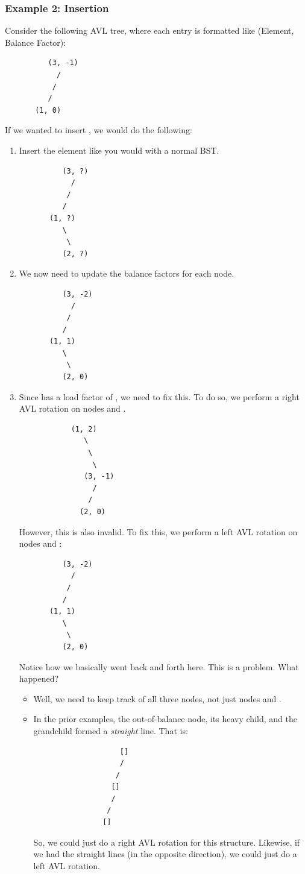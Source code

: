 \documentclass[letterpaper]{article}
\begin{document}
\subsubsection{Example 2: Insertion}
Consider the following AVL tree, where each entry is formatted like (Element, Balance Factor): 
\begin{verbatim}
          (3, -1)
            /
           /
          /
       (1, 0)
\end{verbatim}
If we wanted to insert , we would do the following: 
\begin{enumerate}[(1)]
    \item Insert the element like you would with a normal BST. 
    \begin{verbatim}
          (3, ?)
            /
           /
          /
       (1, ?)
          \ 
           \ 
          (2, ?)
    \end{verbatim}

    \item We now need to update the balance factors for each node. 
    \begin{verbatim}
          (3, -2)
            /
           /
          /
       (1, 1)
          \ 
           \ 
          (2, 0)
    \end{verbatim}

    \item Since  has a load factor of , we need to fix this. To do so, we perform a right AVL rotation on nodes  and .
    \begin{verbatim}
            (1, 2)
               \ 
                \ 
                 \ 
               (3, -1)
                 /
                /
              (2, 0)      
    \end{verbatim}
    However, this is also invalid. To fix this, we perform a left AVL rotation on nodes  and : 
    \begin{verbatim}
          (3, -2)
            /
           /
          /
       (1, 1)
          \ 
           \ 
          (2, 0)
    \end{verbatim}
    Notice how we basically went back and forth here. This is a problem. What happened? 
    \begin{itemize}
        \item Well, we need to keep track of all three nodes, not just nodes  and .
        \item In the prior examples, the out-of-balance node, its heavy child, and the grandchild formed a \emph{straight} line. That is: 
        \begin{verbatim}
                    []
                    /
                   /
                  []
                  /
                 /
                []
        \end{verbatim}
        So, we could just do a right AVL rotation for this structure. Likewise, if we had the straight lines (in the opposite direction), we could just do a left AVL rotation. 
        

\end{itemize}
\end{enumerate}
\end{document}
